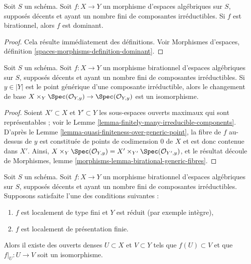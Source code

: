 \begin{lemma}
\label{lemma-birational-dominant}
Soit $S$ un schéma. Soit $f : X \to Y$ un morphisme d'espaces algébriques
sur $S$, supposés décents et ayant un nombre fini de composantes
irréductibles. Si $f$ est birationnel, alors $f$ est dominant.
\end{lemma}

\begin{proof}
Cela résulte immédiatement des définitions. Voir Morphismes d'espaces,
définition \ref{spaces-morphisms-definition-dominant}.
\end{proof}

\begin{lemma}
\label{lemma-birational-generic-fibres}
Soit $S$ un schéma. Soit $f : X \to Y$ un morphisme birationnel d'espaces
algébriques sur $S$, supposés décents et ayant un nombre fini de composantes
irréductibles. Si $y \in |Y|$ est le point générique d'une composante
irréductible, alors le changement de base
$X \times_Y \Spec(\mathcal{O}_{Y, y}) \to
\Spec(\mathcal{O}_{Y, y})$ est un isomorphisme.
\end{lemma}

\begin{proof}
Soient $X' \subset X$ et $Y' \subset Y$ les sous-espaces ouverts maximaux
qui sont représentables ; voir le
Lemme \ref{lemma-finitely-many-irreducible-components}.
D'après le Lemme \ref{lemma-quasi-finiteness-over-generic-point},
la fibre de $f$ au-dessus de $y$ est constituée de points de codimension $0$
de $X$ et est donc contenue dans $X'$. Ainsi,
$X \times_Y \Spec(\mathcal{O}_{Y, y}) =
X' \times_{Y'} \Spec(\mathcal{O}_{Y', y})$, et le résultat découle de
Morphismes, lemme \ref{morphisms-lemma-birational-generic-fibres}.
\end{proof}

\begin{lemma}
\label{lemma-birational-birational}
Soit $S$ un schéma. Soit $f : X \to Y$ un morphisme birationnel d'espaces
algébriques sur $S$, supposés décents et ayant un nombre fini de composantes
irréductibles. Supposons satisfaite l'une des conditions suivantes :
\begin{enumerate}
\item $f$ est localement de type fini et $Y$ est réduit
(par exemple intègre),
\item $f$ est localement de présentation finie.
\end{enumerate}
Alors il existe des ouverts denses $U \subset X$ et $V \subset Y$ tels que
$f(U) \subset V$ et que $f|_U : U \to V$ soit un isomorphisme.
\end{lemma}

